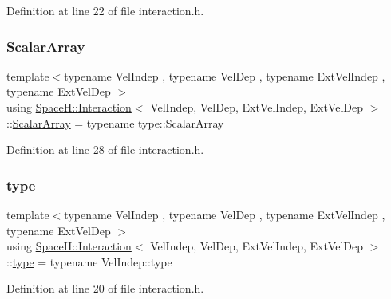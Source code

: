 Definition at line 22 of file interaction.\+h.

\mbox{\label{class_space_h_1_1_interaction_af9db1e366eeabfcd2dcea3e4343e3f57}} 
\subsubsection{\texorpdfstring{Scalar\+Array}{ScalarArray}}
{\footnotesize\ttfamily template$<$typename Vel\+Indep , typename Vel\+Dep , typename Ext\+Vel\+Indep , typename Ext\+Vel\+Dep $>$ \\
using \mbox{\hyperlink{class_space_h_1_1_interaction}{Space\+H\+::\+Interaction}}$<$ Vel\+Indep, Vel\+Dep, Ext\+Vel\+Indep, Ext\+Vel\+Dep $>$\+::\mbox{\hyperlink{class_space_h_1_1_interaction_af9db1e366eeabfcd2dcea3e4343e3f57}{Scalar\+Array}} =  typename type\+::\+Scalar\+Array}



Definition at line 28 of file interaction.\+h.

\mbox{\label{class_space_h_1_1_interaction_a0bed18b8b8efcb42be264a255f931be6}} 
\subsubsection{\texorpdfstring{type}{type}}
{\footnotesize\ttfamily template$<$typename Vel\+Indep , typename Vel\+Dep , typename Ext\+Vel\+Indep , typename Ext\+Vel\+Dep $>$ \\
using \mbox{\hyperlink{class_space_h_1_1_interaction}{Space\+H\+::\+Interaction}}$<$ Vel\+Indep, Vel\+Dep, Ext\+Vel\+Indep, Ext\+Vel\+Dep $>$\+::\mbox{\hyperlink{class_space_h_1_1_interaction_a0bed18b8b8efcb42be264a255f931be6}{type}} =  typename Vel\+Indep\+::type}



Definition at line 20 of file interaction.\+h.

\mbox{\label{class_space_h_1_1_interaction_ad6d656d30b9272a5f690b0412a4a9a86}} 
